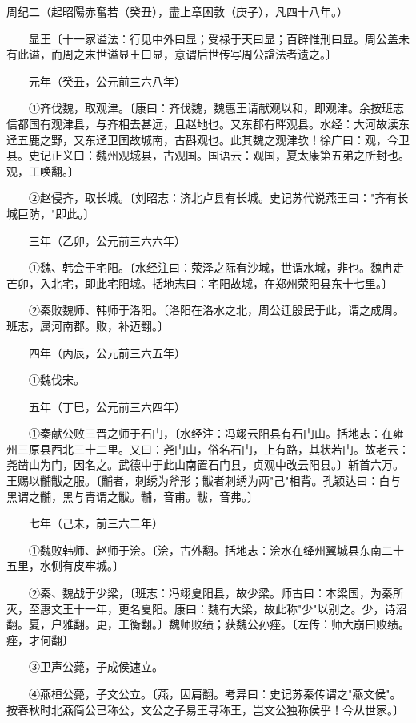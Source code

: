 周纪二（起昭陽赤奮若（癸丑），盡上章困敦（庚子），凡四十八年。）

　　显王〔十一家谥法：行见中外曰显；受禄于天曰显；百辟惟刑曰显。周公盖未有此谥，而周之末世谥显王曰显，意谓后世传写周公諡法者遗之。〕

　　元年（癸丑，公元前三六八年）

　　①齐伐魏，取观津。〔康曰：齐伐魏，魏惠王请献观以和，即观津。余按班志信都国有观津县，与齐相去甚远，且赵地也。又东郡有畔观县。水经：大河故渎东迳五鹿之野，又东迳卫国故城南，古斟观也。此其魏之观津欤！徐广曰：观，今卫县。史记正义曰：魏州观城县，古观国。国语云：观国，夏太康第五弟之所封也。观，工唤翻。〕

　　②赵侵齐，取长城。〔刘昭志：济北卢县有长城。史记苏代说燕王曰："齐有长城巨防，"即此。〕

　　三年（乙卯，公元前三六六年）

　　①魏、韩会于宅阳。〔水经注曰：荥泽之际有沙城，世谓水城，非也。魏冉走芒卯，入北宅，即此宅阳城。括地志曰：宅阳故城，在郑州荥阳县东十七里。〕

　　②秦败魏师、韩师于洛阳。〔洛阳在洛水之北，周公迁殷民于此，谓之成周。班志，属河南郡。败，补迈翻。〕

　　四年（丙辰，公元前三六五年）

　　①魏伐宋。

　　五年（丁巳，公元前三六四年）

　　①秦献公败三晋之师于石门，〔水经注：冯翊云阳县有石门山。括地志：在雍州三原县西北三十二里。又曰：尧门山，俗名石门，上有路，其状若门。故老云：尧凿山为门，因名之。武德中于此山南置石门县，贞观中改云阳县。〕斩首六万。王赐以黼黻之服。〔黼者，刺绣为斧形；黻者刺绣为两"己"相背。孔颖达曰：白与黑谓之黼，黑与青谓之黻。黼，音甫。黻，音弗。〕

　　七年（己未，前三六二年）

　　①魏败韩师、赵师于浍。〔浍，古外翻。括地志：浍水在绛州翼城县东南二十五里，水侧有皮牢城。〕

　　②秦、魏战于少梁，〔班志：冯翊夏阳县，故少梁。师古曰：本梁国，为秦所灭，至惠文王十一年，更名夏阳。康曰：魏有大梁，故此称"少"以别之。少，诗沼翻。夏，户雅翻。更，工衡翻。〕魏师败绩；获魏公孙痤。〔左传：师大崩曰败绩。痤，才何翻〕

　　③卫声公薨，子成侯速立。

　　④燕桓公薨，子文公立。〔燕，因肩翻。考异曰：史记苏秦传谓之"燕文侯"。按春秋时北燕简公已称公，文公之子易王寻称王，岂文公独称侯乎！今从世家。〕

